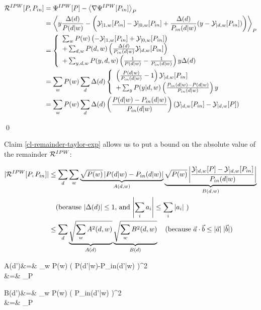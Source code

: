 \begin{align}
{\cal R}^{IPW}[P,P_{in}]
&=
\Psi^{IPW}[P]
-\left\langle\nabla\Psi^{IPW}[P_{in}]\right\rangle_P
\\
&=
\left\langle
y \frac{\Delta(d)}{P(d|w)}
-
\left(
{\cal Y}_{|1,w}[P_{in}]
-
{\cal Y}_{|0,w}[P_{in}]
+
\frac{\Delta(d)}{P_{in}(d|w)}
(y-{\cal Y}_{|d,w}[P_{in}])
\right)
\right\rangle_{P}
\\
&=
\left\{
\begin{array}{l}
\sum_w P(w)\left(
-{\cal Y}_{|1,w}[P_{in}]
+
{\cal Y}_{|0,w}[P_{in}]
\right)
\\
+\sum_{d,w} P(d,w) \left(
\frac{\Delta(d)}{P_{in}(d|w)}
{\cal Y}_{|d,w}[P_{in}]
\right)
\\
+\sum_{y,d,w} P(y, d,w)\left(
\frac{1}{P(d|w)}- \frac{1}{P_{in}(d|w)}
\right) y\Delta(d)
\end{array}
\right.
\\
&=\sum_w P(w)\sum_d \Delta(d)
\left\{
\begin{array}{l}
\left(
\frac{P(d|w)}{P_{in}(d|w)}-1
\right)
{\cal Y}_{|d,w}[P_{in}]
\\
+\sum_{y}P(y|d,w)\left(
\frac{P_{in}(d|w)-P(d|w)}{P_{in}(d|w)}
\right) y
\end{array}
\right.
\\
&=
\sum_w P(w)\sum_d \Delta(d)
\left(\frac{P(d|w)-P_{in}(d|w)}{P_{in}(d|w)}
\right)
({\cal Y}_{|d,w}[P_{in}]-
{\cal Y}_{|d,w}[P])
\end{align}

\qed

Claim \ref{cl-remainder-taylor-exp}
allows us to put a bound
on the absolute value of the remainder ${\cal R}^{IPW}$:

\begin{align}
|{\cal R}^{IPW}[P,P_{in}]|&\leq
\sum_d \sum_w
\underbrace{\sqrt{P(w)}
\left|
P(d|w)-P_{in}(d|w)
\right|}_{A(d,w)}
\underbrace{\sqrt{P(w)}
\left|
\frac{
{\cal Y}_{|d,w}[P]-{\cal Y}_{|d,w}[P_{in}]}
{P_{in}(d|w)}
\right|}_{B(d,w)}
\nonumber
\\&
\quad\text{(because
$|\Delta(d)|\leq 1$, and $\left|\sum_i a_i\right|\leq \sum_i |a_i|$ )}
\\
&\leq
\sum_d
\underbrace{\sqrt{\sum_w A^2(d,w)}}_{A(d)}
\underbrace{\sqrt{\sum_w B^2(d,w)}}_{B(d)}
\quad \text{(because ${\vec{a}}\cdot {\vec{b}}\leq |{\vec{a}}|\;|{\vec{b}}|$)}
\end{align}

\beqa
A(d')&=&
\sum_w P(w)
\left(
P(d'|w)-P_{in}(d'|w)
\right)^2
\\
&=&
_P
\eeqa

\beqa
B(d')&=&
\sum_w P(w)
\left(
{P_{in}(d'|w)}
\right)^2
\\
&=&
_P
\eeqa


